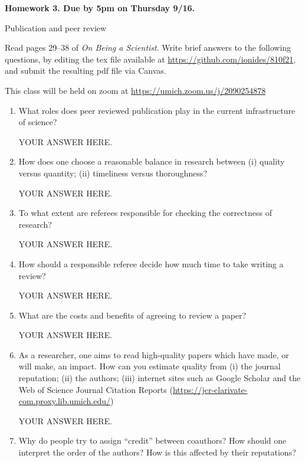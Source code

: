 \documentclass[12pt]{article}
\begin{document}
\begin{center}\bf
Homework 3. Due by 5pm on Thursday 9/16.

Publication and peer review

\end{center}

Read pages 29--38 of {\em On Being a Scientist}. Write brief answers to the following questions, by editing the tex file available at \url{https://github.com/ionides/810f21}, and submit the resulting pdf file via Canvas. 

This class will be held on zoom  at \url{https://umich.zoom.us/j/2090254878}

\begin{enumerate}
\item What roles does peer reviewed publication play in the current infrastructure of science? 

YOUR ANSWER HERE.

\item How does one choose a reasonable balance in research between (i) quality versus quantity; (ii) timeliness versus thoroughness?

YOUR ANSWER HERE.

\item To what extent are referees responsible for checking the correctness of research? 

YOUR ANSWER HERE.

\item How should a responsible referee decide how much time to take writing a review? 

YOUR ANSWER HERE.

\item What are the costs and benefits of agreeing to review a paper?

YOUR ANSWER HERE.

\item As a researcher, one aims to read high-quality papers which have made, or will make, an impact. How can you estimate quality from (i) the journal reputation; (ii) the authors; (iii) internet sites such as Google Scholar and the Web of Science Journal Citation Reports (\url{https://jcr-clarivate-com.proxy.lib.umich.edu/})  

YOUR ANSWER HERE.

\item Why do people try to assign ``credit'' between coauthors? How should one interpret the order of the authors? How is this affected by their reputations? 


\end{enumerate}
\end{document}
